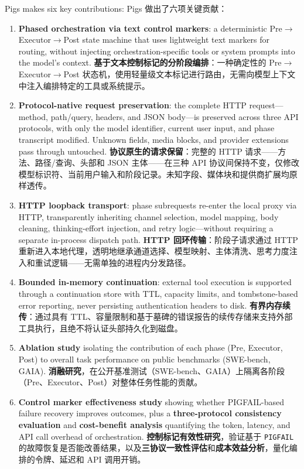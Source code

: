 Pigs makes six key contributions:
Pigs 做出了六项关键贡献：

\begin{enumerate}
    \item \textbf{Phased orchestration via text control markers}: a deterministic Pre$\rightarrow$Executor$\rightarrow$Post state machine that uses lightweight text markers for routing, without injecting orchestration-specific tools or system prompts into the model's context.
    \textbf{基于文本控制标记的分阶段编排}：一种确定性的 Pre$\rightarrow$Executor$\rightarrow$Post 状态机，使用轻量级文本标记进行路由，无需向模型上下文中注入编排特定的工具或系统提示。
    \item \textbf{Protocol-native request preservation}: the complete HTTP request---method, path/query, headers, and JSON body---is preserved across three API protocols, with only the model identifier, current user input, and phase transcript modified. Unknown fields, media blocks, and provider extensions pass through untouched.
    \textbf{协议原生的请求保留}：完整的 HTTP 请求——方法、路径/查询、头部和 JSON 主体——在三种 API 协议间保持不变，仅修改模型标识符、当前用户输入和阶段记录。未知字段、媒体块和提供商扩展均原样透传。
    \item \textbf{HTTP loopback transport}: phase subrequests re-enter the local proxy via HTTP, transparently inheriting channel selection, model mapping, body cleaning, thinking-effort injection, and retry logic---without requiring a separate in-process dispatch path.
    \textbf{HTTP 回环传输}：阶段子请求通过 HTTP 重新进入本地代理，透明地继承通道选择、模型映射、主体清洗、思考力度注入和重试逻辑——无需单独的进程内分发路径。
    \item \textbf{Bounded in-memory continuation}: external tool execution is supported through a continuation store with TTL, capacity limits, and tombstone-based error reporting, never persisting authentication headers to disk.
    \textbf{有界内存续传}：通过具有 TTL、容量限制和基于墓碑的错误报告的续传存储来支持外部工具执行，且绝不将认证头部持久化到磁盘。
    \item \textbf{Ablation study} isolating the contribution of each phase (Pre, Executor, Post) to overall task performance on public benchmarks (SWE-bench, GAIA).
    \textbf{消融研究}，在公开基准测试（SWE-bench、GAIA）上隔离各阶段（Pre、Executor、Post）对整体任务性能的贡献。
    \item \textbf{Control marker effectiveness study} showing whether PIGFAIL-based failure recovery improves outcomes, plus a \textbf{three-protocol consistency evaluation} and \textbf{cost-benefit analysis} quantifying the token, latency, and API call overhead of orchestration.
    \textbf{控制标记有效性研究}，验证基于 \texttt{PIGFAIL} 的故障恢复是否能改善结果，以及\textbf{三协议一致性评估}和\textbf{成本效益分析}，量化编排的令牌、延迟和 API 调用开销。
\end{enumerate}

